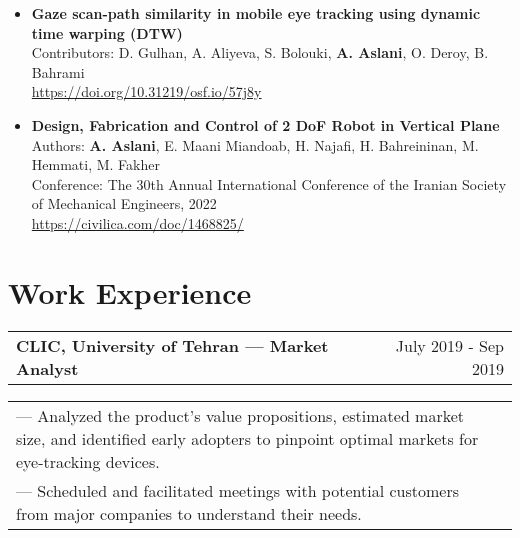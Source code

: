 \documentclass[a4paper,10pt]{article}
\begin{document}
\begin{itemize}
    \item \textbf{Gaze scan-path similarity in mobile eye tracking using dynamic time warping (DTW)}\\
    Contributors: D. Gulhan, A. Aliyeva, S. Bolouki, \textbf{A. Aslani}, O. Deroy, B. Bahrami\\
    \href{https://doi.org/10.31219/osf.io/57j8y}{https://doi.org/10.31219/osf.io/57j8y}
\end{itemize}


\begin{itemize}
    \item \textbf{Design, Fabrication and Control of 2 DoF Robot in Vertical Plane}\\
    Authors: \textbf{A. Aslani}, E. Maani Miandoab, H. Najafi, H. Bahreininan, M. Hemmati, M. Fakher\\
    Conference: The 30th Annual International Conference of the Iranian Society of Mechanical Engineers, 2022\\
    \href{https://civilica.com/doc/1468825/}{https://civilica.com/doc/1468825/}
\end{itemize}





\section{Work Experience}

\begin{tabularx}{\linewidth}{@{}X r@{}}
    \textbf{CLIC, University of Tehran — Market Analyst} & \hfill July 2019 - Sep 2019 \\[3.75pt]
\end{tabularx}

\begin{tabularx}{\linewidth}{@{}X r@{}}
    {— Analyzed the product's value propositions, estimated market size, and identified early adopters to pinpoint optimal markets for eye-tracking devices.}\\
    {— Scheduled and facilitated meetings with potential customers from major companies to understand their needs.}\\
\end{tabularx}
\end{document}
